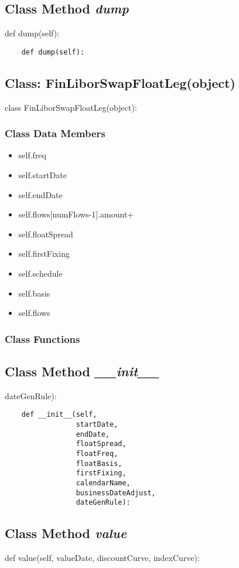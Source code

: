 \documentclass[twoside,11pt]{book}
\begin{document}
\subsection{Class Method {\it dump}}
def dump(self):

\begin{lstlisting}
    def dump(self):
\end{lstlisting}

\subsection{Class: FinLiborSwapFloatLeg(object)}
class FinLiborSwapFloatLeg(object):

\subsubsection{Class Data Members}
\begin{itemize}
\item{self.freq}
\item{self.startDate}
\item{self.endDate}
\item{self.flows[numFlows-1].amount+}
\item{self.floatSpread}
\item{self.firstFixing}
\item{self.schedule}
\item{self.basis}
\item{self.flows}
\end{itemize}

\subsubsection{Class Functions}

\subsection{Class Method {\it \_\_init\_\_}}
dateGenRule):

\begin{lstlisting}
    def __init__(self,
                 startDate,
                 endDate,
                 floatSpread,
                 floatFreq,
                 floatBasis,
                 firstFixing,
                 calendarName,
                 businessDateAdjust,
                 dateGenRule):
\end{lstlisting}

\subsection{Class Method {\it value}}
def value(self, valueDate, discountCurve, indexCurve):
\end{document}
